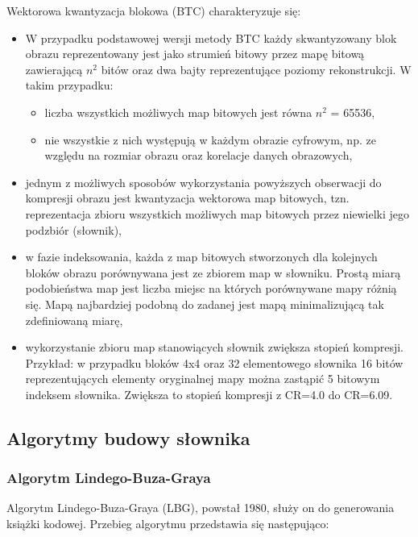 \documentclass{article}
\begin{document}
Wektorowa kwantyzacja blokowa (BTC) charakteryzuje się:

\begin{itemize} 
\item W przypadku podstawowej wersji metody BTC każdy skwantyzowany blok obrazu reprezentowany jest jako strumień 
  bitowy przez mapę bitową zawierającą $n^{2}$ bitów oraz dwa bajty reprezentujące poziomy rekonstrukcji. W takim przypadku:
     \begin{itemize}
        \item liczba wszystkich możliwych map bitowych jest równa $n^{2}$ = 65536,
        \item nie wszystkie z nich występują w każdym obrazie cyfrowym, np. ze względu na rozmiar obrazu oraz korelacje danych obrazowych, 
     \end{itemize}
\item jednym z możliwych sposobów wykorzystania powyższych obserwacji do kompresji obrazu jest 
  kwantyzacja wektorowa map bitowych, tzn. reprezentacja zbioru wszystkich możliwych map bitowych przez niewielki jego podzbiór (słownik),
\item w fazie indeksowania, każda z map bitowych stworzonych dla kolejnych bloków obrazu porównywana jest ze zbiorem map w słowniku. 
  Prostą miarą podobieństwa map jest liczba miejsc na których porównywane mapy różnią się. 
  Mapą najbardziej podobną do zadanej jest mapą minimalizującą tak zdefiniowaną miarę,
\item wykorzystanie zbioru map stanowiących słownik zwiększa stopień kompresji. 
  Przykład: w przypadku bloków 4x4 oraz 32 elementowego słownika 16 bitów reprezentujących 
  elementy oryginalnej mapy można zastąpić 5 bitowym indeksem słownika. Zwiększa to stopień kompresji z CR=4.0 do CR=6.09.
\end{itemize}

\subsection{Algorytmy budowy słownika}

\subsubsection{Algorytm Lindego-Buza-Graya}

Algorytm Lindego-Buza-Graya (LBG), powstał 1980, służy on do generowania książki kodowej. Przebieg algorytmu przedstawia się następująco:
\end{document}
